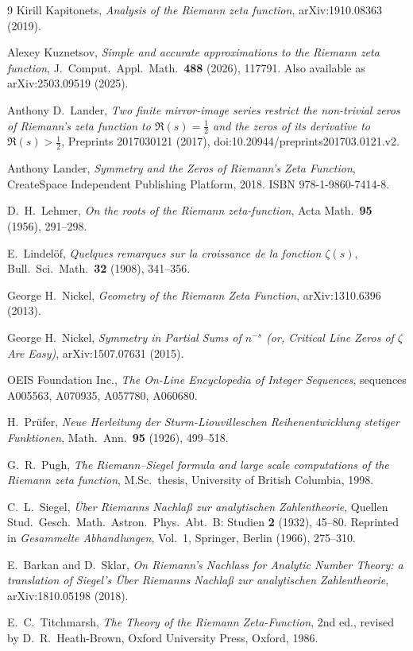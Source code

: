 \documentclass[11pt]{article}
\theoremstyle{definition}
\begin{document}
\begin{thebibliography}{9}
Kirill Kapitonets, \emph{Analysis of the Riemann zeta function},
arXiv:1910.08363 (2019).

Alexey Kuznetsov, \emph{Simple and accurate approximations to the Riemann
zeta function}, J.\ Comput.\ Appl.\ Math.\ \textbf{488} (2026), 117791.
Also available as arXiv:2503.09519 (2025).

Anthony D.\ Lander, \emph{Two finite mirror-image series restrict the
non-trivial zeros of Riemann's zeta function to $\Re(s)=\tfrac12$ and the zeros
of its derivative to $\Re(s)>\tfrac12$}, Preprints 2017030121 (2017),
doi:10.20944/preprints201703.0121.v2.

Anthony Lander, \emph{Symmetry and the Zeros of Riemann's Zeta Function},
CreateSpace Independent Publishing Platform, 2018.
ISBN 978-1-9860-7414-8.

D.~H.\ Lehmer, \emph{On the roots of the Riemann zeta-function},
Acta Math.\ \textbf{95} (1956), 291--298.

E.~Lindel\"of, \emph{Quelques remarques sur la croissance de la fonction
$\zeta(s)$}, Bull.\ Sci.\ Math.\ \textbf{32} (1908), 341--356.

George H.\ Nickel, \emph{Geometry of the Riemann Zeta Function},
arXiv:1310.6396 (2013).

George H.\ Nickel, \emph{Symmetry in Partial Sums of $n^{-s}$ (or, Critical Line
Zeros of $\zeta$ Are Easy)}, arXiv:1507.07631 (2015).

OEIS Foundation Inc., \emph{The On-Line Encyclopedia of Integer Sequences},
sequences A005563, A070935, A057780, A060680.

H.~Pr\"ufer, \emph{Neue Herleitung der Sturm-Liouvilleschen
Reihenentwicklung stetiger Funktionen}, Math.\ Ann.\ \textbf{95} (1926),
499--518.

G.~R.\ Pugh, \emph{The Riemann--Siegel formula and large scale computations
of the Riemann zeta function}, M.Sc.\ thesis, University of British
Columbia, 1998.

C.~L.\ Siegel, \emph{\"Uber Riemanns Nachla\ss{} zur analytischen
Zahlentheorie}, Quellen Stud.\ Gesch.\ Math.\ Astron.\ Phys.\ Abt.\ B:
Studien \textbf{2} (1932), 45--80. Reprinted in \emph{Gesammelte
Abhandlungen}, Vol.~1, Springer, Berlin (1966), 275--310.

E.~Barkan and D.~Sklar, \emph{On Riemann's Nachlass for Analytic Number
Theory: a translation of Siegel's \"Uber Riemanns Nachla\ss{} zur
analytischen Zahlentheorie}, arXiv:1810.05198 (2018).

E.~C.\ Titchmarsh, \emph{The Theory of the Riemann Zeta-Function}, 2nd ed.,
revised by D.~R.\ Heath-Brown, Oxford University Press, Oxford, 1986.

\end{thebibliography}
\end{document}
